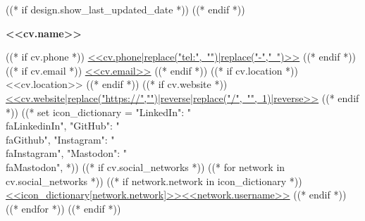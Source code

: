 ((* if design.show_last_updated_date *))
\placelastupdatedtext
((* endif *))

{
    \centering
    \textbf{\fontsize{<<design.header_font_size>>}{<<design.header_font_size>>}\selectfont <<cv.name>>} \\ \vspace{3pt}
    \small

    \vspace{<<design.margins.header.vertical_between_name_and_connections>>}
    
    \begin{spacing}{1.6}
    ((* if cv.phone *))
    \mbox{\href{<<cv.phone|replace("-","")>>}{{\footnotesize\faPhone*}\hspace{4pt}<<cv.phone|replace("tel:", "")|replace("-"," ")>>}}
    \hspace{<<design.margins.header.horizontal_between_connections>>}
    ((* endif *))
    ((* if cv.email *))
    \mbox{\href{mailto:<<cv.email>>}{{\small\faEnvelope[regular]}\hspace{4pt}<<cv.email>>}}
    \hspace{<<design.margins.header.horizontal_between_connections>>}
    ((* endif *))
    ((* if cv.location *))
    \mbox{{\small\faMapMarker*}\hspace{4pt}<<cv.location>>}
    \hspace{<<design.margins.header.horizontal_between_connections>>}
    ((* endif *))
    ((* if cv.website *))
    \mbox{\href{<<cv.website>>}{{\small\faLink}\hspace{4pt}<<cv.website|replace("https://","")|reverse|replace("/", "", 1)|reverse>>}}
    \hspace{<<design.margins.header.horizontal_between_connections>>}
    ((* endif *))
    ((*
        set icon_dictionary = {
            "LinkedIn": "\\faLinkedinIn",
            "GitHub": "\\faGithub",
            "Instagram": "\\faInstagram",
            "Mastodon": "\\faMastodon",
        }
    *))
    ((* if cv.social_networks *))
        ((* for network in cv.social_networks *))
            ((* if network.network in icon_dictionary *))
    \mbox{\href{<<network.url>>}{{\small<<icon_dictionary[network.network]>>}\hspace{4pt}<<network.username>>}}
    \hspace*{<<design.margins.header.horizontal_between_connections>>}
            ((* endif *))
        ((* endfor *))
    ((* endif *))
    \end{spacing}
    \par
}

\vspace{<<design.margins.header.bottom>>}

\let\hrefWithoutArrow\href
\renewcommand{\href}[2]{\hrefWithoutArrow{#1}{\color{primaryColor}\mbox{\ifthenelse{\equal{#2}{}}{}{#2 }\raisebox{.15ex}{\footnotesize \faExternalLink*}}}}